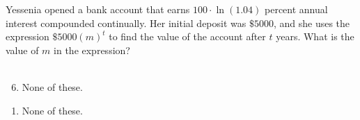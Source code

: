  
Yessenia opened a bank account that earns $100\cdot \ln(1.04)$ percent annual interest compounded continually.  Her initial deposit was $\$5000$, and she uses the expression $\$5000(m)^t$ to find the value of the account after $t$ years.  What is the value of $m$ in the expression?  \\ \\


\ifsat
	\begin{enumerate}[label=\Alph*)]
	\end{enumerate}
\else
\fi

\ifacteven
	\begin{enumerate}[label=\textbf{\Alph*.},itemsep=\fill,align=left]
		\setcounter{enumii}{5}
		\item None of these. 
	\end{enumerate}
\else
\fi

\ifactodd
	\begin{enumerate}[label=\textbf{\Alph*.},itemsep=\fill,align=left]
		\item None of these. 
	\end{enumerate}
\else
\fi

\else
\fi

